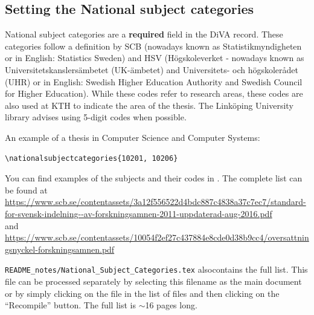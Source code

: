 \documentclass[12pt, twoside]{article}
\newcommand{\fname}[1]{\texttt{#1}}
\begin{document}
\subsection{Setting the National subject categories}
National subject categories are a \textbf{required} field in the \gls{DiVA} record. These categories follow a definition by \foreignlanguage{swedish}{SCB} (nowadays known as \foreignlanguage{swedish}{Statistikmyndigheten} or in English: Statistics Sweden) and HSV (\foreignlanguage{swedish}{Högskoleverket} - nowadays known as  \foreignlanguage{swedish}{Universitetskanslersämbetet (UK-ämbetet)} and \foreignlanguage{swedish}{Universitets- och högskolerådet (UHR)} or in English: Swedish Higher Education Authority and Swedish Council for Higher Education).
While these codes refer to research areas, these codes are also used at \gls{KTH} to indicate the area of the thesis. The Linköping University library advises using 5-digit codes when possible.

An example of a thesis in Computer Science and Computer Systems:
\begin{lstlisting}[style=latexExampleForAuthors]
\nationalsubjectcategories{10201, 10206}
\end{lstlisting}

You can find examples of the subjects and their codes in . The complete list can be found at \url{https://www.scb.se/contentassets/3a12f556522d4bdc887c4838a37c7ec7/standard-for-svensk-indelning--av-forskningsamnen-2011-uppdaterad-aug-2016.pdf}\\
and\\
\url{https://www.scb.se/contentassets/10054f2ef27c437884e8cde0d38b9cc4/oversattningsnyckel-forskningsamnen.pdf}

\fname{README\_notes/National\_Subject\_Categories.tex} also\linebreak[4] contains the full list. This file can be processed separately by selecting this filename as the main document or by simply clicking on the file in the list of files and then clicking on the \enquote{Recompile} button. The full list is $\sim$16 pages long.
\end{document}
